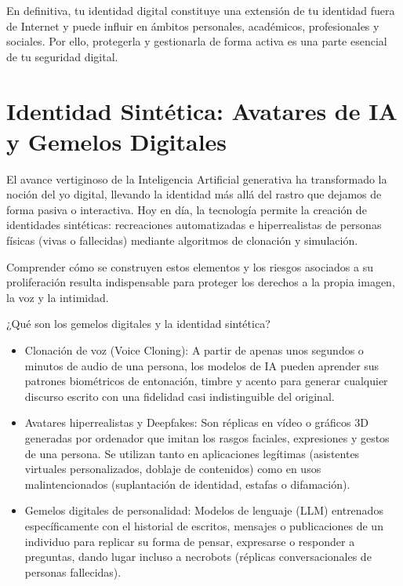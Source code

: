 \documentclass[
  spanish,
  a4paper,
  openany]{book}
\begin{document}
En definitiva, tu identidad digital constituye una extensión de tu identidad fuera de Internet y puede influir en ámbitos personales, académicos, profesionales y sociales. Por ello, protegerla y gestionarla de forma activa es una parte esencial de tu seguridad digital.

\section{Identidad Sintética: Avatares de IA y Gemelos Digitales}\label{identidad-sintuxe9tica-avatares-de-ia-y-gemelos-digitales}

El avance vertiginoso de la Inteligencia Artificial generativa ha transformado la noción del yo digital, llevando la identidad más allá del rastro que dejamos de forma pasiva o interactiva. Hoy en día, la tecnología permite la creación de identidades sintéticas: recreaciones automatizadas e hiperrealistas de personas físicas (vivas o fallecidas) mediante algoritmos de clonación y simulación.

Comprender cómo se construyen estos elementos y los riesgos asociados a su proliferación resulta indispensable para proteger los derechos a la propia imagen, la voz y la intimidad.

¿Qué son los gemelos digitales y la identidad sintética?

\begin{itemize}
\item
  Clonación de voz (Voice Cloning): A partir de apenas unos segundos o minutos de audio de una persona, los modelos de IA pueden aprender sus patrones biométricos de entonación, timbre y acento para generar cualquier discurso escrito con una fidelidad casi indistinguible del original.
\item
  Avatares hiperrealistas y Deepfakes: Son réplicas en vídeo o gráficos 3D generadas por ordenador que imitan los rasgos faciales, expresiones y gestos de una persona. Se utilizan tanto en aplicaciones legítimas (asistentes virtuales personalizados, doblaje de contenidos) como en usos malintencionados (suplantación de identidad, estafas o difamación).
\item
  Gemelos digitales de personalidad: Modelos de lenguaje (LLM) entrenados específicamente con el historial de escritos, mensajes o publicaciones de un individuo para replicar su forma de pensar, expresarse o responder a preguntas, dando lugar incluso a necrobots (réplicas conversacionales de personas fallecidas).
\end{itemize}
\end{document}
